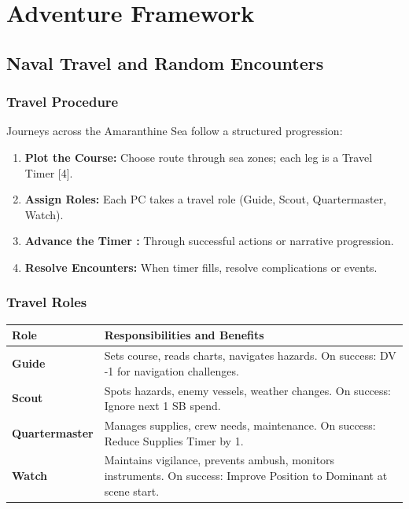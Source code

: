 \documentclass[11pt,oneside]{book}
\begin{document}
\chapter{Adventure Framework}

\section{Naval Travel and Random Encounters}

\subsection*{Travel Procedure}
Journeys across the Amaranthine Sea follow a structured progression:

\begin{enumerate}
  \item \textbf{Plot the Course:} Choose route through sea zones; each leg is a Travel Timer [4].
  \item \textbf{Assign Roles:} Each PC takes a travel role (Guide, Scout, Quartermaster, Watch).
  \item \textbf{Advance the Timer :} Through successful actions or narrative progression.
  \item \textbf{Resolve Encounters:} When timer fills, resolve complications or events.
\end{enumerate}

\subsection*{Travel Roles}
\begin{tabularx}{\linewidth}{@{}l X@{}}
\toprule
\textbf{Role} & \textbf{Responsibilities and Benefits}\\
\midrule
\textbf{Guide} & Sets course, reads charts, navigates hazards. On success: DV -1 for navigation challenges.\\
\textbf{Scout} & Spots hazards, enemy vessels, weather changes. On success: Ignore next 1 SB spend.\\
\textbf{Quartermaster} & Manages supplies, crew needs, maintenance. On success: Reduce Supplies Timer by 1.\\
\textbf{Watch} & Maintains vigilance, prevents ambush, monitors instruments. On success: Improve Position to Dominant at scene start.\\
\bottomrule
\end{tabularx}
\end{document}
